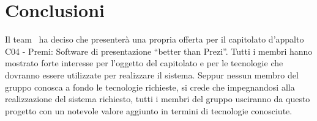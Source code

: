 \section{Conclusioni}
Il team \gruppo\ ha deciso che presenterà una propria offerta per il capitolato d'appalto C04 - Premi: Software di presentazione ``better than Prezi''. Tutti i membri hanno mostrato forte interesse per l'oggetto del capitolato e per le tecnologie che dovranno essere utilizzate per realizzare il sistema. Seppur nessun membro del gruppo conosca a fondo le tecnologie richieste, si crede che impegnandosi alla realizzazione del sistema richiesto, tutti i membri del gruppo usciranno da questo progetto con un notevole valore aggiunto in termini di tecnologie conosciute.